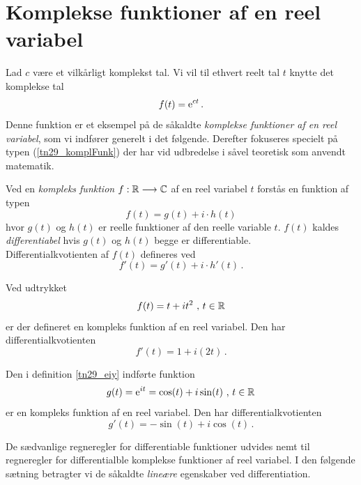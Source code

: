 \section{Komplekse funktioner af en reel variabel}

Lad $c$ være et vilkårligt komplekst tal. Vi vil til ethvert reelt tal $t$ knytte det komplekse tal
\begin{equation}\label{tn29_komplFunk}
f(t)=\mathrm{e}^{ct}\,.
\end{equation}
Denne funktion er et eksempel på de såkaldte \textit{komplekse funktioner af en reel variabel}, som vi indfører generelt i det følgende. Derefter  fokuseres specielt på typen (\ref{tn29_komplFunk}) der har vid udbredelse i såvel teoretisk som anvendt matematik. \bs

\begin{definition}
Ved en \textit{kompleks funktion} $f:\mathbb{R}\longrightarrow \mathbb C$
af en reel variabel $t$ forstås en funktion af typen
\begin{equation}
f(t)=g(t)+i\cdot h(t)
\end{equation}
hvor $g(t)$ og $h(t)$ er reelle funktioner af den reelle variable $t$.\bs
$f(t)$ kaldes \textit{differentiabel} hvis $g(t)$ og $h(t)$ begge er differentiable.\\
Differentialkvotienten af $f(t)$ defineres ved
\begin{equation}\label{tn29_defDiff2}
f'(t)=g'(t)+i\cdot h'(t)\,.
\end{equation}
\end{definition}

\begin{example}
Ved udtrykket
$$f(t)=t+it^2\,\,,\,t\in\mathbb{R}$$
er der defineret en kompleks funktion af en reel variabel. Den har differentialkvotienten
$$f'(t)=1+i(2t)\,.$$
\end{example}

\begin{example}
Den i definition \ref{tn29_eiy} indførte funktion 
$$g(t)=\mathrm{e}^{it}=\cos(t)+i\sin(t)\,\,,\,t\in\mathbb{R}\,$$
er en kompleks funktion af en reel variabel. Den  har differentialkvotienten
$$g'(t)=-\sin(t)+i\cos(t)\,.$$
\end{example}

De sædvanlige regneregler for differentiable funktioner udvides nemt til regneregler for differentialble komplekse funktioner af reel variabel. I den følgende sætning betragter vi de såkaldte \textit{lineære} egenskaber ved differentiation.

